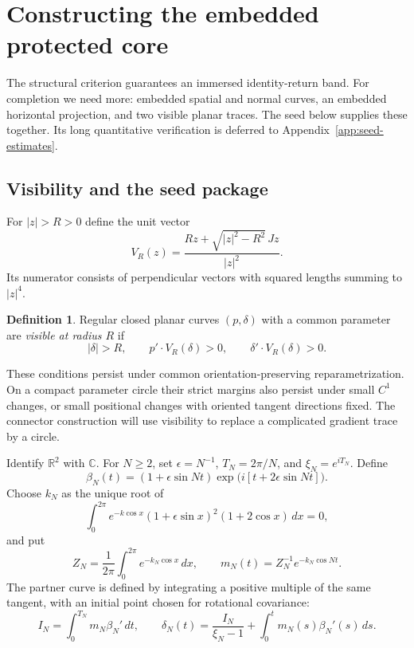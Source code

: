 \documentclass[11pt]{amsart}
\theoremstyle{definition}
\newtheorem{definition}[theorem]{Definition}
\theoremstyle{remark}
\newcommand{\R}{\mathbb R}\newcommand{\Sph}{\mathbb S}
\numberwithin{equation}{section}
\begin{document}
\section{Constructing the embedded protected core}\label{sec:protected-core}
The structural criterion guarantees an immersed identity-return band.
For completion we need more: embedded spatial and normal curves, an
embedded horizontal projection, and two visible planar traces. The seed
below supplies these together. Its long quantitative verification is
deferred to Appendix~\ref{app:seed-estimates}.

\subsection{Visibility and the seed package}\label{sec:corrugated-seed}
For $|z|>R>0$ define the unit vector
\begin{equation}\label{eq:visibility}
 V_R(z)=\frac{Rz+\sqrt{|z|^2-R^2}\,Jz}{|z|^2}.
\end{equation}
Its numerator consists of perpendicular vectors with squared lengths
summing to $|z|^4$.
\begin{definition}\label{def:visible}
Regular closed planar curves $(p,\delta)$ with a common parameter are
\emph{visible at radius $R$} if
\begin{equation}\label{eq:visible-pair}
 |\delta|>R,\qquad p'\cdot V_R(\delta)>0,
 \qquad \delta'\cdot V_R(\delta)>0.
\end{equation}
\end{definition}
These conditions persist under common orientation-preserving
reparametrization. On a compact parameter circle their strict margins
also persist under small $C^1$ changes, or small positional changes with
oriented tangent directions fixed. The connector construction will use
visibility to replace a complicated gradient trace by a circle.

Identify $\R^2$ with $\mathbb C$. For $N\ge2$, set
$\epsilon=N^{-1}$, $T_N=2\pi/N$, and $\xi_N=e^{iT_N}$. Define
\begin{equation}\label{eq:corrugated-beta}
 \beta_N(t)=(1+\epsilon\sin Nt)
          \exp\bigl(i[t+2\epsilon\sin Nt]\bigr).
\end{equation}
Choose $k_N$ as the unique root of
\begin{equation}\label{eq:corrugated-root}
 \int_0^{2\pi}e^{-k\cos x}(1+\epsilon\sin x)^2(1+2\cos x)\,dx=0,
\end{equation}
and put
\[
 Z_N=\frac1{2\pi}\int_0^{2\pi}e^{-k_N\cos x}\,dx,
 \qquad m_N(t)=Z_N^{-1}e^{-k_N\cos Nt}.
\]
The partner curve is defined by integrating a positive multiple of the
same tangent, with an initial point chosen for rotational covariance:
\begin{equation}\label{eq:corrugated-delta}
 I_N=\int_0^{T_N}m_N\beta_N'\,dt,
 \qquad
 \delta_N(t)=\frac{I_N}{\xi_N-1}+\int_0^t m_N(s)\beta_N'(s)\,ds.
\end{equation}
\end{document}
